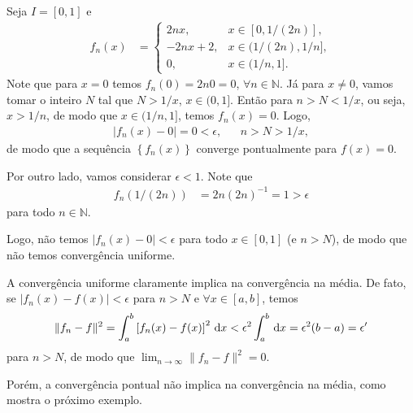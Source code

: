 \begin{exem}
    Seja $I = [0, 1]$ e
    \begin{align*}
        f_n(x) &= \begin{cases}
            2 n x, & x \in [0, 1 / (2n)], \\
            -2 n x + 2, & x \in (1 / (2n), 1 / n], \\
            0, & x \in (1 / n, 1].
        \end{cases}
    \end{align*}
    Note que para $x = 0$ temos $f_n(0) = 2 n 0 = 0$, $\forall n \in \mathbb{N}$. J\'{a} para $x \neq 0$, vamos tomar o inteiro $N$ tal que $N > 1 / x$, $x \in (0, 1]$. Ent\~{a}o para $n > N < 1 / x$, ou seja, $x > 1 / n$, de modo que $x \in (1/n, 1]$, temos $f_n(x) = 0$. Logo,
    \begin{align*}
        | f_n(x) - 0 | = 0 < \epsilon, && n > N > 1/x,
    \end{align*}
    de modo que a sequ\^{e}ncia $\left\{ f_n(x) \right\}$ converge pontualmente para $f(x) = 0$.

    Por outro lado, vamos considerar $\epsilon < 1$. Note que
    \begin{align*}
        f_n\left( 1/\left( 2n \right) \right) &= 2 n \left( 2 n \right)^{-1} = 1 > \epsilon
    \end{align*}
    para todo $n \in \mathbb{N}$.

    Logo, n\~{a}o temos $| f_n(x) - 0 | < \epsilon$ para todo $x \in [0,1]$ (e $n > N$), de modo que n\~{a}o temos converg\^{e}ncia uniforme.
\end{exem}

A converg\^{e}ncia uniforme claramente implica na converg\^{e}ncia na m\'{e}dia. De fato, se $| f_n(x) - f(x) | < \epsilon$ para $n > N$ e $\forall x \in [a,b]$, temos
\begin{align*}
    \| f_n - f \|^2 = \int_a^b \left[ f_n(x) - f(x) \right]^2 \, \mathrm{d}x < \epsilon^2 \int_a^b \, \mathrm{d}x = \epsilon^2 (b - a) = \epsilon'
\end{align*}
para $n > N$, de modo que $\lim_{n \to \infty} \| f_n - f \|^2 = 0$.

Por\'{e}m, a converg\^{e}ncia pontual n\~{a}o implica na converg\^{e}ncia na m\'{e}dia, como mostra o pr\'{o}ximo exemplo.

